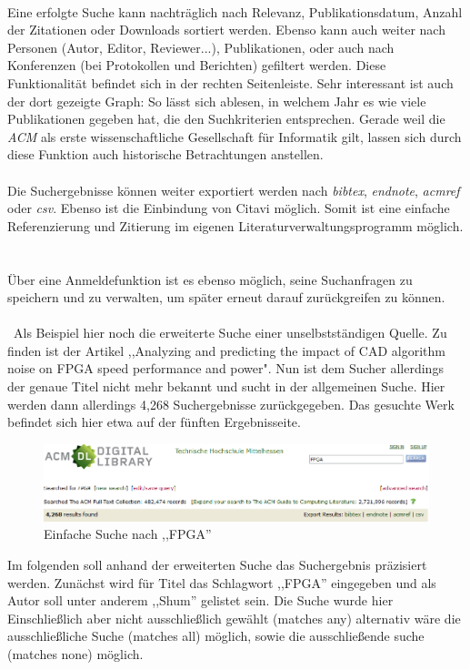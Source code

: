 \documentclass[
	ngerman,
	parskip=half,
	headsepline,
	fontsize=12pt,
	DIV=13,
	listof=leveldown,
	]{scrreprt}
\begin{document}
		\ \\
		Eine erfolgte Suche kann nachträglich nach Relevanz, Publikationsdatum, Anzahl der Zitationen oder Downloads sortiert werden. Ebenso kann auch weiter nach Personen (Autor, Editor, Reviewer...), Publikationen, oder auch nach Konferenzen (bei Protokollen und Berichten) gefiltert werden. Diese Funktionalität befindet sich in der rechten Seitenleiste. Sehr interessant ist auch der dort gezeigte Graph: So lässt sich ablesen, in welchem Jahr es wie viele Publikationen gegeben hat, die den Suchkriterien entsprechen. Gerade weil die \textit{ACM} als erste wissenschaftliche Gesellschaft für Informatik gilt, lassen sich durch diese Funktion auch historische Betrachtungen anstellen.
		\ \\
		\ \\
		Die Suchergebnisse können weiter exportiert werden nach \textit{bibtex}, \textit{endnote}, \textit{acmref} oder \textit{csv}. Ebenso ist die Einbindung von Citavi möglich. Somit ist eine einfache Referenzierung und Zitierung im eigenen Literaturverwaltungsprogramm möglich.
		\ \\
		\ \\
		Über eine Anmeldefunktion ist es ebenso möglich, seine Suchanfragen zu speichern und zu verwalten, um später erneut darauf zurückgreifen zu können.	
\\\
\\\
Als Beispiel hier noch die erweiterte Suche einer unselbstständigen Quelle. Zu finden ist der Artikel ,,Analyzing and predicting the impact of CAD algorithm noise on FPGA speed performance and power". Nun ist dem Sucher allerdings der genaue Titel nicht mehr bekannt und sucht in der allgemeinen Suche. Hier werden dann allerdings 4,268 Suchergebnisse zurückgegeben. Das gesuchte Werk befindet sich hier etwa auf der fünften Ergebnisseite. 
\begin{figure}[ht]
\centering
\includegraphics[width=\textwidth]{img/Suche_FPGA.PNG}
\caption{Einfache Suche nach ,,FPGA''}
\end{figure}
Im folgenden soll anhand der erweiterten Suche das Suchergebnis präzisiert werden. Zunächst wird für Titel das Schlagwort ,,FPGA'' eingegeben und als Autor soll unter anderem ,,Shum'' gelistet sein.
Die Suche wurde hier Einschließlich aber nicht ausschließlich gewählt (matches any) alternativ wäre die ausschließliche Suche (matches all) möglich, sowie die ausschließende suche (matches none) möglich.
\end{document}

